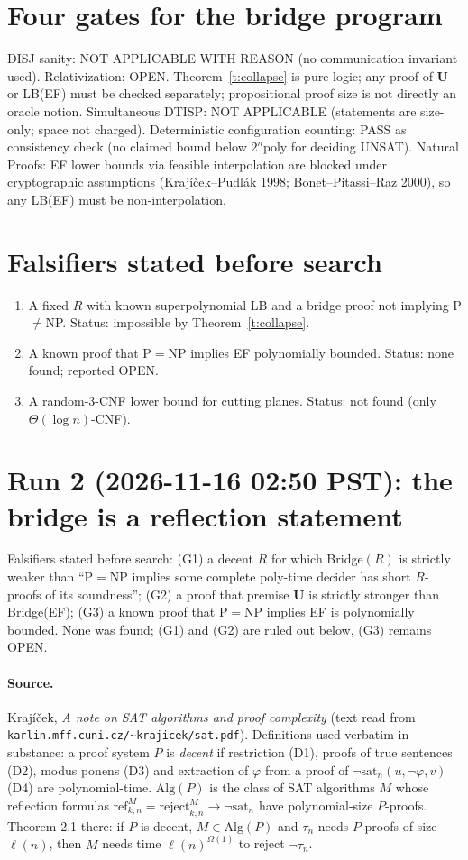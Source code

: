 \documentclass[11pt]{article}
\begin{document}
\section{Four gates for the bridge program}
DISJ sanity: NOT APPLICABLE WITH REASON (no communication invariant used).
Relativization: OPEN. Theorem~\ref{t:collapse} is pure logic; any proof of $\mathbf U$ or LB(EF)
must be checked separately; propositional proof size is not directly an oracle notion.
Simultaneous DTISP: NOT APPLICABLE (statements are size-only; space not charged).
Deterministic configuration counting: PASS as consistency check (no claimed bound below
$2^n\mathrm{poly}$ for deciding UNSAT). Natural Proofs: EF lower bounds via feasible
interpolation are blocked under cryptographic assumptions (Kraj\'i\v{c}ek--Pudl\'ak 1998;
Bonet--Pitassi--Raz 2000), so any LB(EF) must be non-interpolation.

\section{Falsifiers stated before search}
\begin{enumerate}
\item[F1] A fixed $R$ with known superpolynomial LB and a bridge proof not implying P$\ne$NP.
Status: impossible by Theorem~\ref{t:collapse}.
\item[F2] A known proof that P$=$NP implies EF polynomially bounded. Status: none found;
reported OPEN.
\item[F3] A random-3-CNF lower bound for cutting planes. Status: not found (only
$\Theta(\log n)$-CNF).
\end{enumerate}


\section{Run 2 (2026-11-16 02:50 PST): the bridge is a reflection statement}
Falsifiers stated before search: (G1) a decent $R$ for which Bridge$(R)$ is strictly weaker
than ``P$=$NP implies some complete poly-time decider has short $R$-proofs of its
soundness''; (G2) a proof that premise $\mathbf U$ is strictly stronger than Bridge(EF);
(G3) a known proof that P$=$NP implies EF is polynomially bounded. None was found;
(G1) and (G2) are ruled out below, (G3) remains OPEN.

\paragraph{Source.} Kraj\'i\v{c}ek, \emph{A note on SAT algorithms and proof complexity}
(text read from \texttt{karlin.mff.cuni.cz/\~{}krajicek/sat.pdf}). Definitions used verbatim
in substance: a proof system $P$ is \emph{decent} if restriction (D1), proofs of true
sentences (D2), modus ponens (D3) and extraction of $\varphi$ from a proof of
$\neg\mathrm{sat}_n(u,\neg\varphi,v)$ (D4) are polynomial-time. $\mathrm{Alg}(P)$ is the class
of SAT algorithms $M$ whose reflection formulas
$\mathrm{ref}^M_{k,n}=\mathrm{reject}^M_{k,n}\to\neg\mathrm{sat}_n$ have polynomial-size
$P$-proofs. Theorem 2.1 there: if $P$ is decent, $M\in\mathrm{Alg}(P)$ and $\tau_n$ needs
$P$-proofs of size $\ell(n)$, then $M$ needs time $\ell(n)^{\Omega(1)}$ to reject $\neg\tau_n$.
\end{document}
